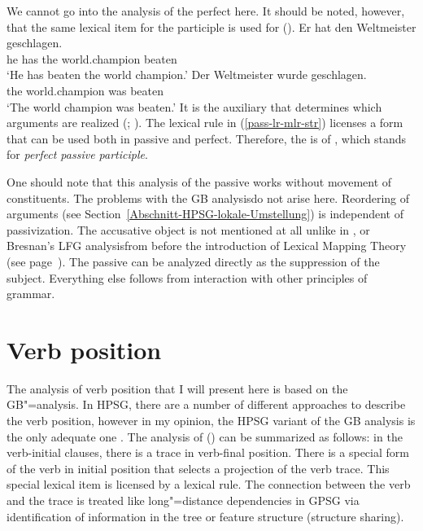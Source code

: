 We cannot go into the analysis of the perfect here. It should be noted, however, that the same lexical
item for the participle is
used for ().
\eal
\ex 
\gll Er hat den Weltmeister geschlagen.\\
	 he has the world.champion beaten\\
\glt `He has beaten the world champion.'
\ex 
\gll Der Weltmeister wurde geschlagen.\\
	 the world.champion was beaten\\
\glt `The world champion was beaten.'
\zl
It is the auxiliary that determines which arguments are realized (\citealp{Haider86}; \citealp[Chapter~17]{MuellerLehrbuch1}).
The lexical rule in (\ref{pass-lr-mlr-str}) licenses a form that can be used both in passive and perfect. Therefore, the
\vformv is of , which stands for \emph{perfect passive participle}.

One should note that this analysis of the passive works without movement of constituents. The problems with the GB analysis\indexgb do not arise here.
Reordering of arguments (see Section~\ref{Abschnitt-HPSG-lokale-Umstellung}) is independent of passivization. The accusative object is not mentioned
at all unlike in \gpsg, \cg or Bresnan's LFG analysis\indexlfg from before the introduction of
Lexical Mapping Theory (see page~\pageref{page-LMT}). The passive can be analyzed directly as the suppression of the subject. Everything else follows from interaction with other principles of grammar.

\section{Verb position}
\label{Abschnitt-Verbstellung-HPSG}

The analysis of verb position that I will present here is based on the GB"=analysis. In HPSG, there are a number of different approaches
to describe the verb position, however in my opinion, the HPSG variant of the GB analysis is the only adequate one \citep{Mueller2005c,Mueller2005d,MuellerGS}.
The analysis of () can be summarized as follows: in the verb-initial clauses, there is a trace in verb-final position. There is a special form of the 
verb in initial position that selects a projection of the verb trace. This special lexical item is licensed by a lexical rule. The connection between the
verb and the trace is treated like long"=distance dependencies in GPSG via identification of information in the tree or feature structure (structure sharing).

